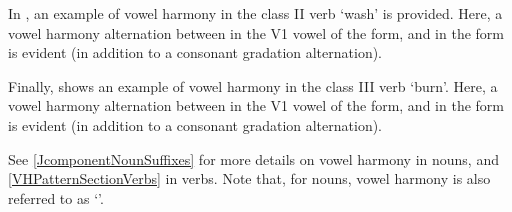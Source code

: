 In , an example of vowel harmony in the class II verb  ‘wash’ is provided. Here, a vowel harmony alternation between  in the V1 vowel of the  form, and  in the  form is evident (in addition to a consonant gradation alternation). 
\ea\label{vhEx2}%
\z

Finally,  shows an example of vowel harmony in the class III verb  ‘burn’. Here, a vowel harmony alternation between  in the V1 vowel of the  form, and  in the  form is evident (in addition to a consonant gradation alternation). 
\ea\label{vhEx3}%
\z


See \SEC\ref{JcomponentNounSuffixes} for more details on vowel harmony in nouns, and \SEC\ref{VHPatternSectionVerbs} in verbs. Note that, for nouns, vowel harmony is also referred to as ‘\jvh’.
\FB




